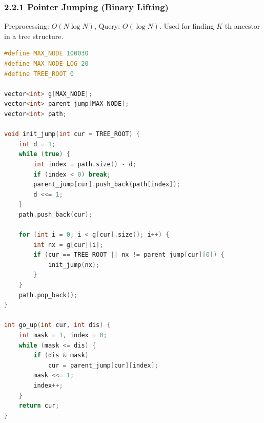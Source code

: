\documentclass[10pt, a4paper, twocolumn]{article}
\begin{document}
\subsubsection{2.2.1 Pointer Jumping (Binary Lifting)}
Preprocessing: $O(N \log N)$, Query: $O(\log N)$. Used for finding $K$-th ancestor in a tree structure.
\begin{lstlisting}[language=C++]
#define MAX_NODE 100030
#define MAX_NODE_LOG 20
#define TREE_ROOT 0

vector<int> g[MAX_NODE];
vector<int> parent_jump[MAX_NODE];
vector<int> path;

void init_jump(int cur = TREE_ROOT) {
	int d = 1;
	while (true) {
		int index = path.size() - d;
		if (index < 0) break;
		parent_jump[cur].push_back(path[index]);
		d <<= 1;
	}
	path.push_back(cur);

    for (int i = 0; i < g[cur].size(); i++) {
        int nx = g[cur][i];
        if (cur == TREE_ROOT || nx != parent_jump[cur][0]) {
            init_jump(nx);
        }
    }
    path.pop_back();
}

int go_up(int cur, int dis) {
	int mask = 1, index = 0;
	while (mask <= dis) {
		if (dis & mask)
			cur = parent_jump[cur][index];
		mask <<= 1;
		index++;
	}
	return cur;
}
\end{lstlisting}
\end{document}
